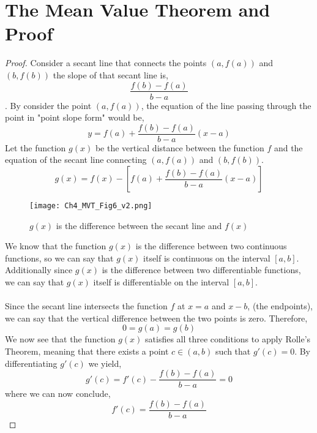 \documentclass{article}
\theoremstyle{plain}
\theoremstyle{definition}
\begin{document}
\section{The Mean Value Theorem and Proof} \label{sect:MVT}
    \begin{proof}
        Consider a secant line that connects the points $(a,f(a))$ and $(b,f(b))$ the slope of that secant line is,
        $$\frac{f(b)-f(a)}{b-a}$$.
        By consider the point $(a,f(a))$, the equation of the line passing through the point in "point slope form" would be,
        $$y=f(a) +\frac{f(b)-f(a)}{b-a}(x-a)$$
        Let the function $g(x)$ be the vertical distance between the function $f$ and the equation of the secant line connecting $(a,f(a))$ and $(b,f(b))$.
        $$g(x) = f(x) -\left[f(a) +\frac{f(b)-f(a)}{b-a}(x-a)\right]$$
    \begin{figure}[H]
        \centering
        \texttt{[image: Ch4\_MVT\_Fig6\_v2.png]}
        \caption{$g(x)$ is the difference between the secant line and $f(x)$}
        \label{fig:mvtDifference}
    \end{figure}
        We know that the function $g(x)$ is the difference between two continuous functions, so we can say that $g(x)$ itself is continuous on the interval $[a,b]$.\\
        Additionally since $g(x)$ is the difference between two differentiable functions, we can say that $g(x)$ itself is differentiable on the interval $[a,b]$.\\\\
        Since the secant line intersects the function $f$ at $x=a$ and $x-b$, (the endpoints), we can say that the vertical difference between the two points is zero. Therefore, $$0 = g(a) =g(b)$$
        We now see that the function $g(x)$ satisfies all three conditions to apply Rolle's Theorem, meaning that there exists a point $c\in(a,b)$ such that $g'(c)=0$.
        By differentiating $g'(c)$ we yield,
        $$g'(c)=f'(c)-\frac{f(b)-f(a)}{b-a}=0$$
        where we can now conclude,
        $$f'(c)=\frac{f(b)-f(a)}{b-a}$$
        
    \end{proof}
\end{document}
